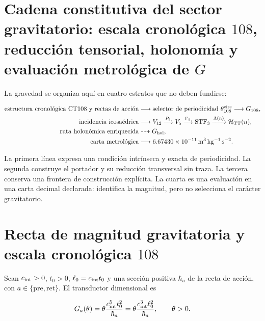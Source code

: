 \label{ch:gravity}

\section{Cadena constitutiva del sector gravitatorio: escala cronológica \(108\), reducción tensorial, holonomía y evaluación metrológica de \(G\)}

La gravedad se organiza aqu\'i en cuatro estratos que no deben fundirse:

\begin{equation}
\label{eq:gravity-causal-chain}
\begin{aligned}
\text{estructura cronol\'ogica CT108 y rectas de acci\'on}
&\longrightarrow \text{selector de periodicidad }\theta_{108}^{\rm circ}
\longrightarrow G_{108},\\
\text{incidencia icosa\'edrica}
&\longrightarrow V_{12}\xrightarrow{P_5}V_5
\xrightarrow{\Gamma_5}\operatorname{STF}_3
\xrightarrow{\Lambda(n)}\mathcal H_{\rm TT}(n),\\
\text{ruta holon\'omica enriquecida}
&\dashrightarrow G_{\rm hol},\\
\text{carta metrol\'ogica}
&\longrightarrow 6.67430\times10^{-11}\,
\mathrm{m^3\,kg^{-1}\,s^{-2}}.
\end{aligned}
\end{equation}

La primera l\'inea expresa una condici\'on intr\'inseca y exacta de
periodicidad. La segunda construye
el portador y su reducci\'on transversal sin traza. La tercera conserva una
frontera de construcci\'on expl\'icita. La cuarta es una evaluaci\'on en una
carta decimal declarada: identifica la magnitud, pero no selecciona el car\'acter
gravitatorio.

\section{Recta de magnitud gravitatoria y escala cronol\'ogica \(108\)}

Sean \(c_{\rm int}>0\), \(t_0>0\),
\(\ell_0=c_{\rm int}t_0\) y una secci\'on positiva
\(\hbar_a\) de la recta de acci\'on, con
\(a\in\{\mathrm{pre},\mathrm{ret}\}\). El transductor dimensional es

\begin{equation}
\label{eq:gravity-transducer}
G_a(\theta)
=\theta\frac{c_{\rm int}^{5}t_0^2}{\hbar_a}
=\theta\frac{c_{\rm int}^{3}\ell_0^2}{\hbar_a},
\qquad \theta>0.
\end{equation}

